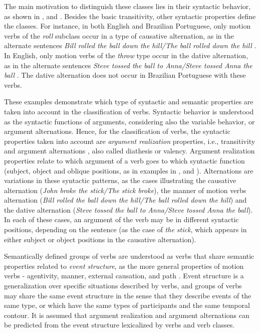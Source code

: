 \documentclass[english]{textolivre}
\begin{document}
The main motivation to distinguish these classes lies in their syntactic behavior, as shown in ,  and . Besides the basic transitivity, other syntactic properties define the classes. For instance, in both English and Brazilian Portuguese, only motion verbs of the \textit{roll} subclass occur in a type of causative alternation, as in the alternate sentences \textit{Bill rolled the ball down the hill/The ball rolled down the hill} \cite[p.~265]{levin_english_1993}. In English, only motion verbs of the \textit{throw} type occur in the dative alternation, as in the alternate sentences \textit{Steve tossed the ball to Anna/Steve tossed Anna the ball} \cite[p.~147]{levin_english_1993}. The dative alternation does not occur in Brazilian Portuguese with these verbs.

These examples demonstrate which type of syntactic and semantic properties are taken into account in the classification of verbs. Syntactic behavior is understood as the syntactic functions of arguments, considering also the variable behavior, or argument alternations. Hence, for the classification of verbs, the syntactic properties taken into account are \textit{argument realization} properties, i.e., transitivity and argument alternations \cite{levin_argument_2005}, also called diathesis or valency. Argument realization properties relate to which argument of a verb goes to which syntactic function (subject, object and oblique positions, as in examples in ,  and ). Alternations are variations in these syntactic patterns, as the cases illustrating the causative alternation (\textit{John broke the stick/The stick broke}), the manner of motion verbs alternation (\textit{Bill rolled the ball down the hill/The ball rolled down the hill}) and the dative alternation (\textit{Steve tossed the ball to Anna/Steve tossed Anna the ball}). In each of these cases, an argument of the verb may be in different syntactic positions, depending on the sentence (as the case of \textit{the stick}, which appears in either subject or object positions in the causative alternation).

Semantically defined groups of verbs are understood as verbs that share semantic properties related to \textit{event structure}, as the more general properties of motion verbs - agentivity, manner, external causation, and path \cite{levin_argument_2005}. Event structure is a generalization over specific situations described by verbs, and groups of verbs may share the same event structure in the sense that they describe events of the same type, or which have the same types of participants and the same temporal contour. It is assumed that argument realization and argument alternations can be predicted from the event structure lexicalized by verbs and verb classes.
\end{document}
